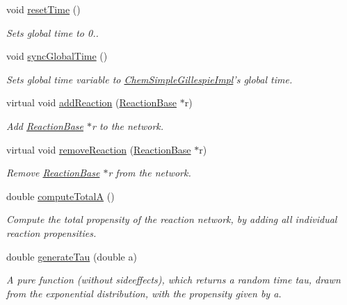 \begin{DoxyCompactItemize}
void \hyperlink{classChemSimpleGillespieImpl_a7f2a327db32bdb720e986a4bcc1f627f}{reset\+Time} ()
\begin{DoxyCompactList}\small\item\em Sets global time to 0.. \end{DoxyCompactList}\item 
void \hyperlink{classChemSimpleGillespieImpl_adb9fefe1b19d4fb2ad8f905886f06ad8}{sync\+Global\+Time} ()
\begin{DoxyCompactList}\small\item\em Sets global time variable to \hyperlink{classChemSimpleGillespieImpl}{Chem\+Simple\+Gillespie\+Impl}'s global time. \end{DoxyCompactList}\item 
virtual void \hyperlink{classChemSimpleGillespieImpl_a6d7ab2e4669fa0e0f226eaa3b548d7ef}{add\+Reaction} (\hyperlink{classReactionBase}{Reaction\+Base} $\ast$r)
\begin{DoxyCompactList}\small\item\em Add \hyperlink{classReactionBase}{Reaction\+Base} $\ast$r to the network. \end{DoxyCompactList}\item 
virtual void \hyperlink{classChemSimpleGillespieImpl_a86175630cf6a1a9344be5a3db7a5e551}{remove\+Reaction} (\hyperlink{classReactionBase}{Reaction\+Base} $\ast$r)
\begin{DoxyCompactList}\small\item\em Remove \hyperlink{classReactionBase}{Reaction\+Base} $\ast$r from the network. \end{DoxyCompactList}\item 
double \hyperlink{classChemSimpleGillespieImpl_aefcfc018e2aef74949240ef9209b563a}{compute\+Total\+A} ()
\begin{DoxyCompactList}\small\item\em Compute the total propensity of the reaction network, by adding all individual reaction propensities. \end{DoxyCompactList}\item 
double \hyperlink{classChemSimpleGillespieImpl_a9946ad8f0a1976d837a97966a2d8f0bd}{generate\+Tau} (double a)
\begin{DoxyCompactList}\small\item\em A pure function (without sideeffects), which returns a random time tau, drawn from the exponential distribution, with the propensity given by a. \end{DoxyCompactList}\item 

\end{DoxyCompactItemize}
